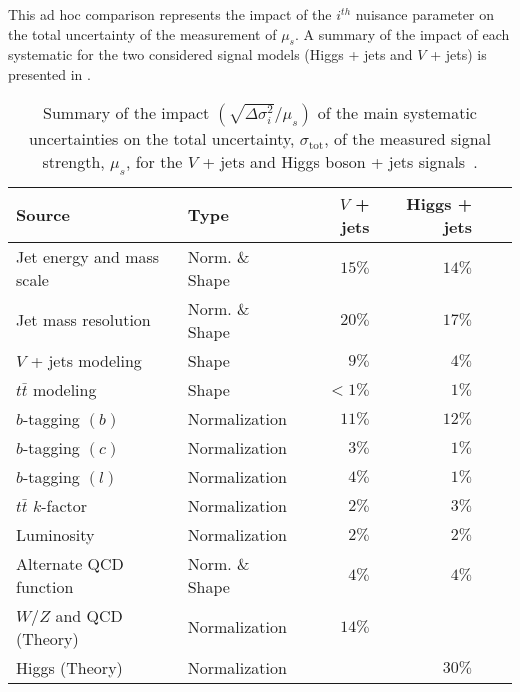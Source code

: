 This ad hoc comparison represents the impact of the $i^{th}$ nuisance parameter
on the total uncertainty of the measurement of $\mu_{s}$. A summary of the
impact of each systematic for the two considered signal models (Higgs + jets
and $V$ + jets) is presented in .

\begin{table}[htpb]
 \centering
 \caption{
  Summary of the impact $(\sqrt{\Delta \sigma_i^2}/\mu_{s})$ of the main systematic uncertainties on the total uncertainty, $\sigma_{\text{tot}}$, of the measured signal strength, $\mu_{s}$, for the $V$ + jets and Higgs boson + jets signals~\cite{ATLAS-CONF-2018-052}.}
 \begin{adjustbox}{max width=\textwidth}
  \begin{tabular}{@{}llrrrr@{}}
   \toprule
   Source                    & Type           & $V$ + jets & Higgs + jets  \\ \midrule
   Jet energy and mass scale & Norm. \& Shape & $15\%$     & $14\%$ \\
   Jet mass resolution       & Norm. \& Shape & $20\%$     & $17\%$ \\
   $V$ + jets modeling       & Shape          & $9\%$      & $4\%$  \\
   $t\bar{t}$ modeling       & Shape          & $<1\%$     & $1\%$  \\
   $b$-tagging $(b)$         & Normalization  & $11\%$     & $12\%$ \\
   $b$-tagging $(c)$         & Normalization  & $3\%$      & $1\%$  \\
   $b$-tagging $(l)$         & Normalization  & $4\%$      & $1\%$  \\
   $t\bar{t}$ $k$-factor     & Normalization  & $2\%$      & $3\%$  \\
   Luminosity                & Normalization  & $2\%$      & $2\%$  \\
   Alternate QCD function    & Norm. \& Shape & $4\%$      & $4\%$  \\
   $W$/$Z$ and QCD (Theory)  & Normalization  & $14\%$     &        \\
   Higgs (Theory)            & Normalization  &            & $30\%$ \\
   \bottomrule
  \end{tabular}
 \end{adjustbox}
 \label{table:systematic_uncertainties}
\end{table}
